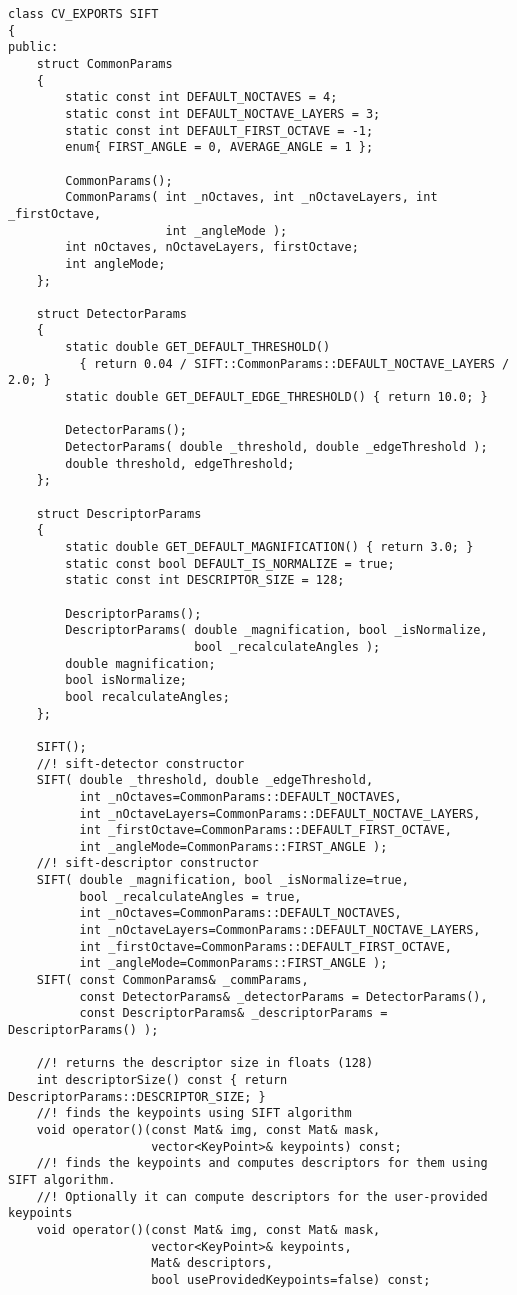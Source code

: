 \begin{lstlisting}
class CV_EXPORTS SIFT
{
public:
    struct CommonParams
    {
        static const int DEFAULT_NOCTAVES = 4;
        static const int DEFAULT_NOCTAVE_LAYERS = 3;
        static const int DEFAULT_FIRST_OCTAVE = -1;
        enum{ FIRST_ANGLE = 0, AVERAGE_ANGLE = 1 };

        CommonParams();
        CommonParams( int _nOctaves, int _nOctaveLayers, int _firstOctave, 
					  int _angleMode );
        int nOctaves, nOctaveLayers, firstOctave;
        int angleMode;
    };

    struct DetectorParams
    {
        static double GET_DEFAULT_THRESHOLD() 
          { return 0.04 / SIFT::CommonParams::DEFAULT_NOCTAVE_LAYERS / 2.0; }
        static double GET_DEFAULT_EDGE_THRESHOLD() { return 10.0; }

        DetectorParams();
        DetectorParams( double _threshold, double _edgeThreshold );
        double threshold, edgeThreshold;
    };

    struct DescriptorParams
    {
        static double GET_DEFAULT_MAGNIFICATION() { return 3.0; }
        static const bool DEFAULT_IS_NORMALIZE = true;
        static const int DESCRIPTOR_SIZE = 128;

        DescriptorParams();
        DescriptorParams( double _magnification, bool _isNormalize, 
						  bool _recalculateAngles );
        double magnification;
        bool isNormalize;
        bool recalculateAngles;
    };

    SIFT();
    //! sift-detector constructor
    SIFT( double _threshold, double _edgeThreshold,
          int _nOctaves=CommonParams::DEFAULT_NOCTAVES,
          int _nOctaveLayers=CommonParams::DEFAULT_NOCTAVE_LAYERS,
          int _firstOctave=CommonParams::DEFAULT_FIRST_OCTAVE,
          int _angleMode=CommonParams::FIRST_ANGLE );
    //! sift-descriptor constructor
    SIFT( double _magnification, bool _isNormalize=true,
          bool _recalculateAngles = true,
          int _nOctaves=CommonParams::DEFAULT_NOCTAVES,
          int _nOctaveLayers=CommonParams::DEFAULT_NOCTAVE_LAYERS,
          int _firstOctave=CommonParams::DEFAULT_FIRST_OCTAVE,
          int _angleMode=CommonParams::FIRST_ANGLE );
    SIFT( const CommonParams& _commParams,
          const DetectorParams& _detectorParams = DetectorParams(),
          const DescriptorParams& _descriptorParams = DescriptorParams() );

    //! returns the descriptor size in floats (128)
    int descriptorSize() const { return DescriptorParams::DESCRIPTOR_SIZE; }
    //! finds the keypoints using SIFT algorithm
    void operator()(const Mat& img, const Mat& mask,
                    vector<KeyPoint>& keypoints) const;
    //! finds the keypoints and computes descriptors for them using SIFT algorithm. 
    //! Optionally it can compute descriptors for the user-provided keypoints
    void operator()(const Mat& img, const Mat& mask,
                    vector<KeyPoint>& keypoints,
                    Mat& descriptors,
                    bool useProvidedKeypoints=false) const;


\end{lstlisting}
